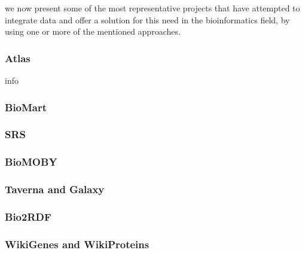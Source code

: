 we now present some of the most representative projects that have attempted to integrate data and offer a solution for this need in the bioinformatics field, by using one or more of the mentioned approaches. 

\subsubsection{Atlas}
info
\subsubsection{BioMart}
\subsubsection{SRS}
\subsubsection{BioMOBY}
\subsubsection{Taverna and Galaxy}
\subsubsection{Bio2RDF}
\subsubsection{WikiGenes and WikiProteins}

